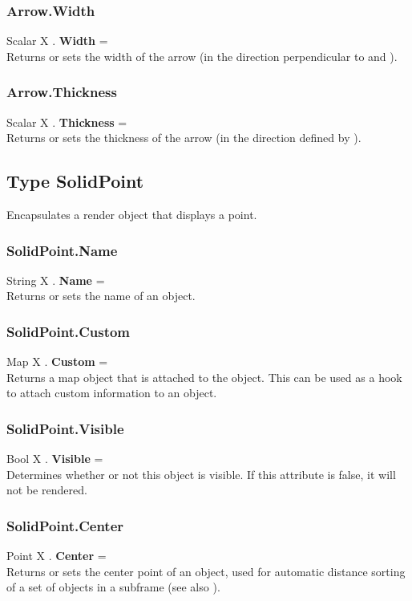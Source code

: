 \subsubsection{Arrow.Width \label{F:Arrow:Width}}
Scalar X . \textbf{Width} = \\
Returns or sets the width of the arrow (in the direction perpendicular to  and ).

\subsubsection{Arrow.Thickness \label{F:Arrow:Thickness}}
Scalar X . \textbf{Thickness} = \\
Returns or sets the thickness of the arrow (in the direction defined by ).

\subsection{Type SolidPoint \label{T:SolidPoint}}
Encapsulates a render object that displays a point.

\subsubsection{SolidPoint.Name \label{F:SolidPoint:Name}}
String X . \textbf{Name} = \\
Returns or sets the name of an object.

\subsubsection{SolidPoint.Custom \label{F:SolidPoint:Custom}}
Map X . \textbf{Custom} = \\
Returns a map object that is attached to the object. This can be used as a hook to attach custom information to an object.


\subsubsection{SolidPoint.Visible \label{F:SolidPoint:Visible}}
Bool X . \textbf{Visible} = \\
Determines whether or not this object is visible. If this attribute is false, it will not be rendered.

\subsubsection{SolidPoint.Center \label{F:SolidPoint:Center}}
Point X . \textbf{Center} = \\
Returns or sets the center point of an object, used for automatic distance sorting of a set of objects in a subframe (see also ).

